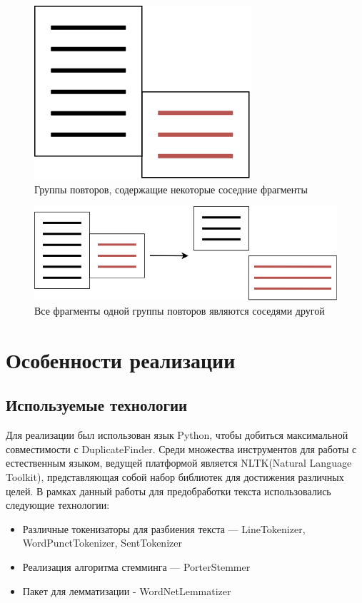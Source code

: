 \documentclass[14pt]{matmex-diploma-custom}
\begin{document}
\begin{figure}[h!]
	\includegraphics[scale=0.5]{pictures/Balance2.png}
	\centering
	\caption{Группы повторов, содержащие некоторые соседние фрагменты}
	\label{fig:Balance2}
\end{figure}

\begin{figure}[h!]
	\includegraphics[scale=0.5]{pictures/Balance3.png}
	\centering
	\caption{Все фрагменты одной группы повторов являются соседями другой}
	\label{fig:Balance3}
\end{figure}

\newpage
\section{Особенности реализации}

\subsection{Используемые технологии}

Для реализации был использован язык Python, чтобы добиться максимальной совместимости с DuplicateFinder. Среди множества инструментов для работы с естественным языком, ведущей платформой является NLTK(Natural Language Toolkit), представляющая собой набор библиотек для достижения различных целей. В рамках данный работы для предобработки текста использовались следующие технологии:
\begin{itemize}
	\item Различные токенизаторы для разбиения текста --- LineTokenizer, WordPunctTokenizer, SentTokenizer
	\item Реализация алгоритма стемминга --- PorterStemmer
	\item Пакет для лемматизации - WordNetLemmatizer
\end{itemize}
\end{document}
